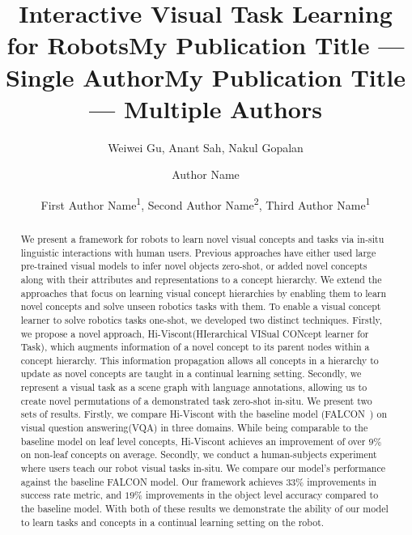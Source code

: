 \documentclass[letterpaper]{article} %
\title{Interactive Visual Task Learning for Robots}
\author{
    Weiwei Gu,
    Anant Sah, 
    Nakul Gopalan
}
\title{My Publication Title --- Single Author}
\author {
    Author Name
}
\title{My Publication Title --- Multiple Authors}
\author {
    First Author Name\textsuperscript{\rm 1},
    Second Author Name\textsuperscript{\rm 2},
    Third Author Name\textsuperscript{\rm 1}
}
\newcommand{\wgnote}[1]{\textcolor{red}{\textbf{WG: #1}}}
\begin{document}
\maketitle


\begin{abstract}
We present a framework for robots to learn novel visual concepts and tasks via in-situ linguistic interactions with human users. Previous approaches have either used large pre-trained visual models to infer novel objects zero-shot, or added novel concepts along with their attributes and representations to a concept hierarchy. We extend the approaches that focus on learning visual concept hierarchies by enabling them to learn novel concepts and solve unseen robotics tasks with them.  To enable a visual concept learner to solve robotics tasks one-shot, we developed two distinct techniques. 
Firstly, we propose a novel approach, Hi-Viscont(HIerarchical VISual CONcept learner for Task), which augments information of a novel concept to its parent nodes within a concept hierarchy. 
This information propagation allows all concepts in a hierarchy to update as novel concepts are taught in a continual learning setting. 
Secondly, we represent a visual task as a scene graph with language annotations, allowing us to create novel permutations of a demonstrated task zero-shot in-situ. 
We present two sets of results. 
Firstly, we compare Hi-Viscont with the baseline model (FALCON~\cite{mei2022falcon}) on visual question answering(VQA) in three domains. 
While being comparable to the baseline model on leaf level concepts, Hi-Viscont achieves an improvement of over $9\%$ on non-leaf concepts on average.
Secondly, we conduct a human-subjects experiment where users teach our robot visual tasks in-situ. We compare our model’s performance against the baseline FALCON model. 
Our framework achieves $33\%$ improvements in success rate metric, and $19\%$ improvements in the object level accuracy compared to the baseline model.
With both of these results we demonstrate the ability of our model to learn tasks and concepts in a continual learning setting on the robot. 
\end{abstract}
\end{document}
